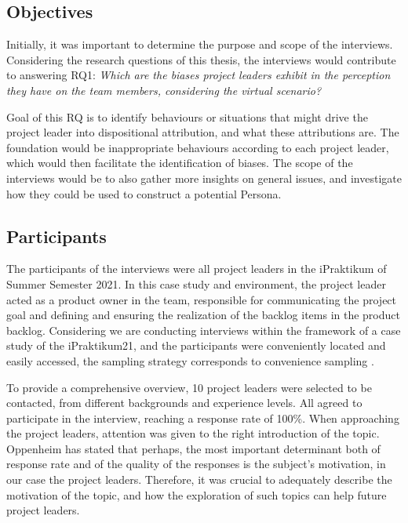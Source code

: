 \subsection{Objectives}

Initially, it was important to determine the purpose and scope of the interviews. Considering the research questions of this thesis, the interviews would contribute to answering RQ1: \textit{Which are the biases project leaders exhibit in the perception they have on the team members, considering the virtual scenario?}

Goal of this RQ is to identify behaviours or situations that might drive the project leader into dispositional attribution, and what these attributions are. The foundation would be inappropriate behaviours according to each project leader, which would then facilitate the identification of biases. The scope of the interviews would be to also gather more insights on general issues, and investigate how they could be used to construct a potential Persona.

\subsection{Participants}

The participants of the interviews were all project leaders in the iPraktikum of Summer Semester 2021. In this case study and environment, the project leader acted as a product owner in the team, responsible for communicating the project goal and defining and ensuring the realization of the backlog items in the product backlog. Considering we are conducting interviews within the framework of a case study of the iPraktikum21, and the participants were conveniently located and easily accessed, the sampling strategy corresponds to convenience sampling \cite{Galloway2005}. 

To provide a comprehensive overview, 10 project leaders were selected to be contacted, from different backgrounds and experience levels. All agreed to participate in the interview, reaching a response rate of 100\%. When approaching the project leaders, attention was given to the right introduction of the topic. Oppenheim \cite{Oppenheim1992} has stated that perhaps, the most important determinant both of response rate and of the quality of the responses is the subject's motivation, in our case the project leaders. Therefore, it was crucial to adequately describe the motivation of the topic, and how the exploration of such topics can help future project leaders. 

